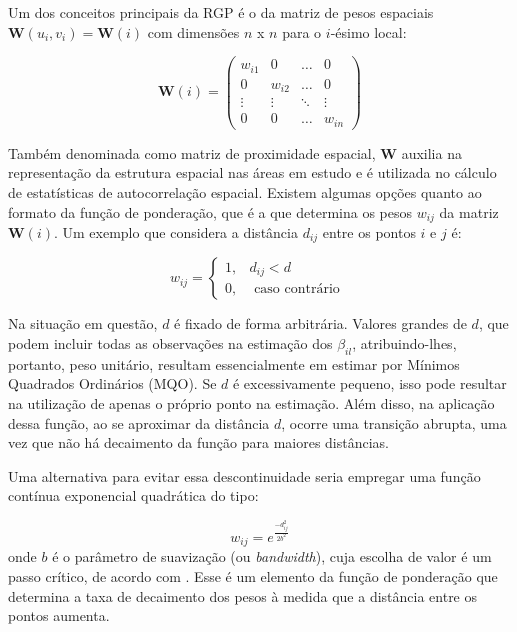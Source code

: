 \documentclass[12pt, a4paper, twoside]{report}
\numberwithin{equation}{section} %
\begin{document}
Um dos conceitos principais da RGP é o da matriz de pesos espaciais  $\boldsymbol{W}(u_i,v_i)=\boldsymbol{W}(i)$ com dimensões $n$ x $n$ para o $i$-ésimo local:

\begin{equation}
\mathbf{W}(i)=\left(\begin{array}{cccc}
w_{i 1} & 0 & \ldots & 0 \\
0 & w_{i 2} & \ldots & 0 \\
\vdots & \vdots & \ddots & \vdots \\
0 & 0 & \ldots & w_{i n} 
\end{array}\right)
\end{equation}

Também denominada como matriz de proximidade espacial, $\boldsymbol{W}$ auxilia na representação da estrutura espacial nas áreas em estudo e é utilizada no cálculo de estatísticas de autocorrelação espacial. Existem algumas opções quanto ao formato da função de ponderação, que é a que determina os pesos $w_{ij}$ da matriz $\boldsymbol{W}(i)$. Um exemplo que considera a distância $d_{ij}$ entre os pontos $i$ e $j$ é: 

\begin{equation}
w_{i j}= \begin{cases}1, & d_{i j}<d \\ 0, & \text { caso contrário }\end{cases} \label{eq:3.2.4}
\end{equation}

Na situação em questão, $d$ é fixado de forma arbitrária. Valores grandes de $d$, que podem incluir todas as observações na estimação dos $\beta_{il}$, atribuindo-lhes, portanto, peso unitário, resultam essencialmente em estimar por Mínimos Quadrados Ordinários (MQO). Se $d$ é excessivamente pequeno, isso pode resultar na utilização de apenas o próprio ponto na estimação. Além disso, na aplicação dessa função, ao se aproximar da distância $d$, ocorre uma transição abrupta, uma vez que não há decaimento da função para maiores distâncias. 

Uma alternativa para evitar essa descontinuidade seria empregar uma função contínua exponencial quadrática do tipo: 

\begin{equation}
    w_{ij} = e^{\frac{-d_{ij}^2}{2b^2}} \label{3.2.5}
\end{equation}
onde $b$ é o parâmetro de suavização (ou \textit{bandwidth}), cuja escolha de valor é um passo crítico, de acordo com \cite{dempster2009}. Esse é um elemento da função de ponderação que determina a taxa de decaimento dos pesos à medida que a distância entre os pontos aumenta. 
\end{document}

